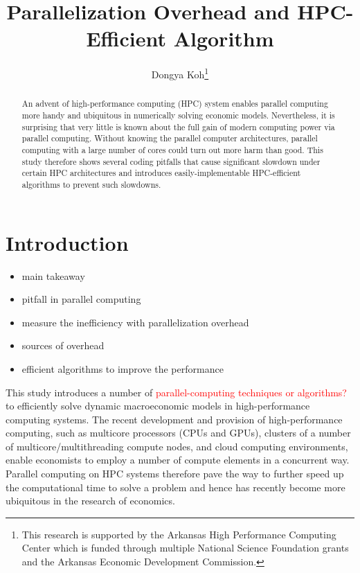 \documentclass[12pt]{article}
\begin{document}
\sf

\title{\textbf{Parallelization Overhead and HPC-Efficient Algorithm}}
\author{Dongya Koh\thanks{\sf This research is supported by the Arkansas High Performance Computing Center which is funded through multiple National Science Foundation grants and the Arkansas Economic Development Commission.}}
\maketitle


\begin{abstract}
An advent of high-performance computing (HPC) system enables parallel computing more handy and ubiquitous in numerically solving economic models. Nevertheless, it is surprising that very little is known about the full gain of modern computing power via parallel computing. Without knowing the parallel computer architectures, parallel computing with a large number of cores could turn out more harm than good. This study therefore shows several coding pitfalls that cause significant slowdown under certain HPC architectures and introduces easily-implementable HPC-efficient algorithms to prevent such slowdowns.
\end{abstract}


\newpage
\section{Introduction}
\begin{itemize}
\item main takeaway
\item pitfall in parallel computing
\item measure the inefficiency with parallelization overhead
\item sources of overhead
\item efficient algorithms to improve the performance
\end{itemize}

This study introduces a number of \textcolor{red}{parallel-computing techniques or algorithms?} to efficiently solve dynamic macroeconomic models in high-performance computing systems. The recent development and provision of high-performance computing, such as multicore processors (CPUs and GPUs), clusters of a number of multicore/multithreading compute nodes, and cloud computing environments, enable economists to employ a number of compute elements in a concurrent way. Parallel computing on HPC systems therefore pave the way to further speed up the computational time to solve a problem and hence has recently become more ubiquitous in the research of economics.
\end{document}
